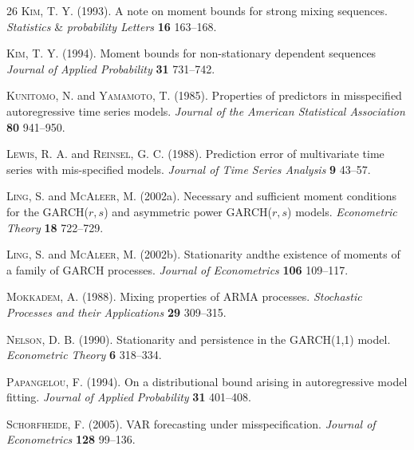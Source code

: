\documentclass[ejsv2]{imsart}
\theoremstyle{plain}
\theoremstyle{definition}
\theoremstyle{remark}
\begin{document}
\begin{thebibliography}{26}
\textsc{Kim, T. Y.} (1993). A note on moment bounds for strong mixing sequences. \textit{Statistics} \& \textit{probability Letters} \textbf{16} 163--168.

\textsc{Kim, T. Y.} (1994). Moment bounds for non-stationary dependent sequences \textit{Journal of Applied Probability} \textbf{31} 731--742.

\textsc{Kunitomo, N.} and \textsc{Yamamoto, T.} (1985). Properties of predictors in misspecified autoregressive time series
  models. \textit{Journal of the American Statistical Association}
\textbf{80} 941--950.

\textsc{Lewis, R. A.} and \textsc{Reinsel, G. C.} (1988). Prediction error of multivariate time series with mis-specified
  models. \textit{Journal of Time Series Analysis}
\textbf{9} 43--57.

\textsc{Ling, S.} and \textsc{McAleer, M.} (2002a). Necessary and sufficient moment conditions for the GARCH($r,s$) and
  asymmetric power GARCH($r,s$) models. \textit{Econometric Theory}
\textbf{18} 722--729.

\textsc{Ling, S.} and \textsc{McAleer, M.} (2002b). Stationarity andthe existence of moments of a family of GARCH processes. \textit{Journal of Econometrics}
\textbf{106} 109--117.

\textsc{Mokkadem, A.} (1988). Mixing properties of ARMA processes. \textit{Stochastic Processes and their Applications} \textbf{29} 309--315.

\textsc{Nelson, D. B.} (1990). Stationarity and persistence in the GARCH(1,1) model. \textit{Econometric Theory}
\textbf{6} 318--334.

\textsc{Papangelou, F.} (1994). On a distributional bound arising in autoregressive model fitting. \textit{Journal of Applied Probability}
\textbf{31} 401--408.

\textsc{Schorfheide, F.} (2005). VAR forecasting under misspecification. \textit{Journal of Econometrics}
\textbf{128} 99--136.


\end{thebibliography}
\end{document}
